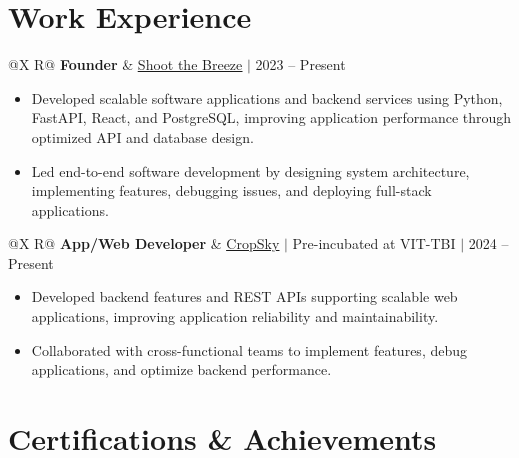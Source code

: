 \documentclass[a4paper,10pt]{article}
\newcommand{\ulink}[2]{\href{#1}{\uline{#2}}}
\newcommand{\subheading}[1]{{\color[HTML]{0A0A0A}\fontsize{12}{14}\selectfont\bfseries #1}}
\newcommand{\meta}[1]{{\color[HTML]{5C5C5C}\fontsize{10.5}{12.5}\selectfont #1}}
\begin{document}
\vspace{4pt}

\newpage
\section{Work Experience}
\vspace{3pt}

\begin{tabularx}{\linewidth}{@{}X R@{}}
  \subheading{Founder} &
  \meta{\ulink{https://shootthebreeze.com}{Shoot the Breeze} $|$ 2023 -- Present}
\end{tabularx}
\begin{itemize}[nosep, leftmargin=1.5em, itemsep=2pt, topsep=3pt]
  \item {\color[HTML]{0A0A0A}\fontsize{11}{15}\selectfont Developed scalable software applications and backend services using Python, FastAPI, React, and PostgreSQL, improving application performance through optimized API and database design.}
  \item {\color[HTML]{0A0A0A}\fontsize{11}{15}\selectfont Led end-to-end software development by designing system architecture, implementing features, debugging issues, and deploying full-stack applications.}
\end{itemize}

\vspace{6pt}

\begin{tabularx}{\linewidth}{@{}X R@{}}
  \subheading{App/Web Developer} &
  \meta{\ulink{https://cropsky.in}{CropSky} $|$ Pre-incubated at VIT-TBI $|$ 2024 -- Present}
\end{tabularx}
\begin{itemize}[nosep, leftmargin=1.5em, itemsep=2pt, topsep=3pt]
  \item {\color[HTML]{0A0A0A}\fontsize{11}{15}\selectfont Developed backend features and REST APIs supporting scalable web applications, improving application reliability and maintainability.}
  \item {\color[HTML]{0A0A0A}\fontsize{11}{15}\selectfont Collaborated with cross-functional teams to implement features, debug applications, and optimize backend performance.}
\end{itemize}

\vspace{4pt}

\section{Certifications \& Achievements}
\vspace{3pt}
\end{document}
